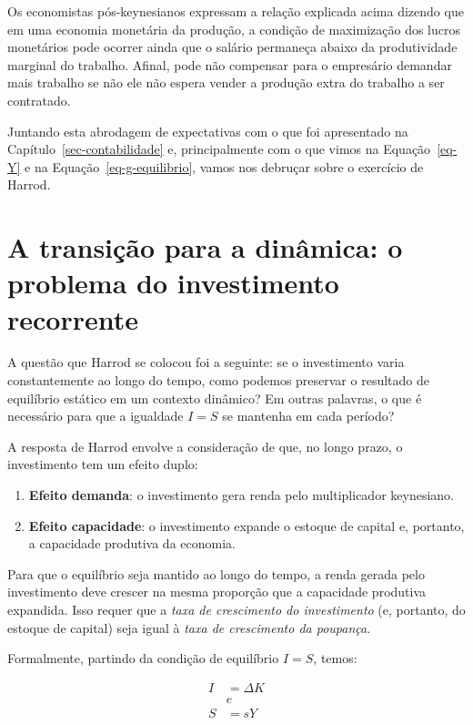 \documentclass[
  brazilian,
  letterpaper,
  DIV=11,
  numbers=noendperiod]{scrreprt}
\providecommand{\tightlist}{%
  \setlength{\itemsep}{0pt}\setlength{\parskip}{0pt}}
\begin{document}
Os economistas pós-keynesianos expressam a relação explicada acima
dizendo que em uma economia monetária da produção, a condição de
maximização dos lucros monetários pode ocorrer ainda que o salário
permaneça abaixo da produtividade marginal do trabalho. Afinal, pode não
compensar para o empresário demandar mais trabalho se não ele não espera
vender a produção extra do trabalho a ser contratado.

Juntando esta abrodagem de expectativas com o que foi apresentado na
Capítulo~\ref{sec-contabilidade} e, principalmente com o que vimos na
Equação~\ref{eq-Y} e na Equação~\ref{eq-g-equilibrio}, vamos nos
debruçar sobre o exercício de Harrod.

\section{A transição para a dinâmica: o problema do investimento
recorrente}\label{sec-dinamica-harrod}

A questão que Harrod se colocou foi a seguinte: se o investimento varia
constantemente ao longo do tempo, como podemos preservar o resultado de
equilíbrio estático em um contexto dinâmico? Em outras palavras, o que é
necessário para que a igualdade \(I = S\) se mantenha em cada período?

A resposta de Harrod envolve a consideração de que, no longo prazo, o
investimento tem um efeito duplo:

\begin{enumerate}
\def\labelenumi{\arabic{enumi}.}
\tightlist
\item
  \textbf{Efeito demanda}: o investimento gera renda pelo multiplicador
  keynesiano.
\item
  \textbf{Efeito capacidade}: o investimento expande o estoque de
  capital e, portanto, a capacidade produtiva da economia.
\end{enumerate}

Para que o equilíbrio seja mantido ao longo do tempo, a renda gerada
pelo investimento deve crescer na mesma proporção que a capacidade
produtiva expandida. Isso requer que a \emph{taxa de crescimento do
investimento} (e, portanto, do estoque de capital) seja igual à
\emph{taxa de crescimento da poupança}.

Formalmente, partindo da condição de equilíbrio \(I = S\), temos:

\[\begin{aligned}
I &= \Delta K\\
& e\\
S &= sY
\end{aligned}\]
\end{document}

